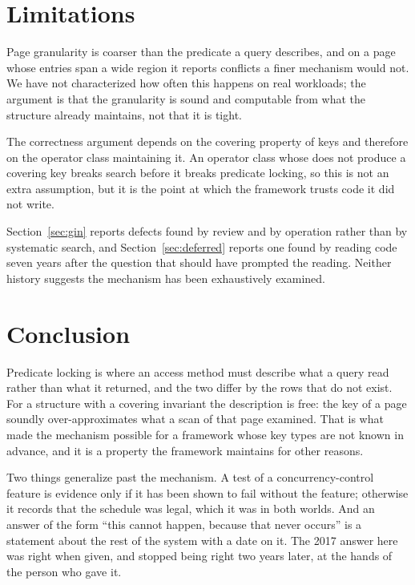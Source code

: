 \section{Limitations}

Page granularity is coarser than the predicate a query describes, and on a page
whose entries span a wide region it reports conflicts a finer mechanism would
not. We have not characterized how often this happens on real workloads; the
argument is that the granularity is sound and computable from what the structure
already maintains, not that it is tight.

The correctness argument depends on the covering property of keys and therefore
on the operator class maintaining it. An operator class whose  does
not produce a covering key breaks search before it breaks predicate locking, so
this is not an extra assumption, but it is the point at which the framework
trusts code it did not write.

Section~\ref{sec:gin} reports defects found by review and by operation rather
than by systematic search, and Section~\ref{sec:deferred} reports one found by
reading code seven years after the question that should have prompted the
reading. Neither history suggests the mechanism has been exhaustively examined.

\section{Conclusion}

Predicate locking is where an access method must describe what a query read
rather than what it returned, and the two differ by the rows that do not exist.
For a structure with a covering invariant the description is free: the key of a
page soundly over-approximates what a scan of that page examined. That is what
made the mechanism possible for a framework whose key types are not known in
advance, and it is a property the framework maintains for other reasons.

Two things generalize past the mechanism. A test of a concurrency-control feature
is evidence only if it has been shown to fail without the feature; otherwise it
records that the schedule was legal, which it was in both worlds. And an answer
of the form ``this cannot happen, because that never occurs'' is a statement
about the rest of the system with a date on it. The 2017 answer here was right
when given, and stopped being right two years later, at the hands of the person
who gave it.
